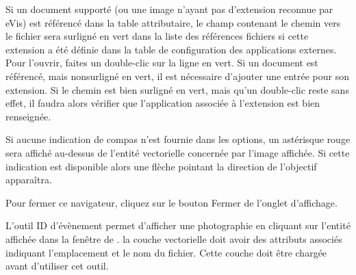 Si un document supporté (ou une image n'ayant pas d'extension reconnue par eVis) est référencé dans la table attributaire, le champ contenant le chemin vers le fichier sera surligné en vert dans la liste des références fichiers si cette extension a été définie dans la table de configuration des applications externes. Pour l'ouvrir, faites un double-clic sur la ligne en vert. Si un document est référencé, mais nonsurligné en vert, il est nécessaire d'ajouter une entrée pour son extension. Si le chemin est bien surligné en vert, mais qu'un double-clic reste sans effet, il faudra alors vérifier que l'application associée à l'extension est bien renseignée.


Si aucune indication de compas n'est fournie dans les options, un astérisque rouge sera affiché au-dessus de l'entité vectorielle concernée par l'image affichée. Si cette indication est disponible alors une flèche pointant la direction de l'objectif apparaîtra.

Pour fermer ce navigateur, cliquez sur le bouton Fermer de l'onglet d'affichage.

L'outil ID d'évènement permet d'afficher une photographie en cliquant sur l'entité affichée dans la fenêtre de \qg. la couche vectorielle doit avoir des attributs associés indiquant l'emplacement et le nom du fichier. Cette couche doit être chargée avant d'utiliser cet outil.

\label{evis_launch_id}

